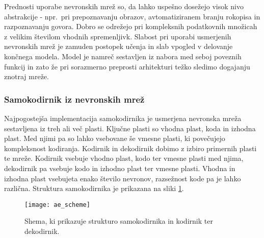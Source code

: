\documentclass[12pt,a4paper,twoside]{article}
\theoremstyle{definition} %
\theoremstyle{plain} %
\numberwithin{equation}{section}  %
\begin{document}
Prednosti uporabe nevronskih mrež so, da lahko uspešno dosežejo visok nivo abstrakcije - 
npr.\ pri prepoznavanju obrazov, avtomatiziranem branju rokopisa in razpoznavanju govora. 
Dobro se odrežejo pri kompleksnih podatkovnih množicah z velikim številom vhodnih spremenljivk. 
Slabost pri uporabi usmerjenih nevronskih mrež je zamuden postopek učenja in slab vpogled v delovanje končnega modela.
Model je namreč sestavljen iz nabora med seboj poveznih funkcij in zato že pri sorazmerno preprosti arhitekturi težko sledimo dogajanju znotraj mreže.



\subsubsection{Samokodirnik iz nevronskih mrež}



Najpogostejša implementacija samokodirnika je usmerjena nevronska mreža sestavljena iz treh ali več plasti.
Ključne plasti so vhodna plast, koda in izhodna plast.
Med njimi pa so lahko vsebovane še vmesne plasti, ki povečujejo kompleksnost kodiranja. 
Kodirnik in dekodirnik dobimo z izbiro primernih plasti te mreže.
Kodirnik vsebuje vhodno plast, kodo ter vmesne plasti med njima, dekodirnik pa vsebuje kodo in izhodno plast ter vmesne plasti. 
Vhodna in izhodna plast vsebujeta enako število nevronov, razsežnost kode pa je lahko različna. 
Struktura samokodirnika je prikazana na sliki \ref{fig:samokodirnik}.

\begin{figure}[h!]
	\label{fig:samokodirnik}
	\centering
	\texttt{[image: ae\_scheme]}
	\caption[Shema samokodirnika]{Shema, ki prikazuje strukturo samokodirnika in kodirnik ter dekodirnik.}
\end{figure}
\end{document}
